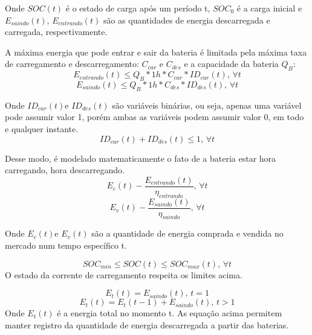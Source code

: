 Onde $SOC(t)$ é o estado de carga após um período t, $SOC_0$ é a carga inicial e  $E_{saindo}(t)$,  $E_{entrando}(t)$ são as quantidades de energia descarregada e carregada, respectivamente.

    A máxima energia que pode entrar e sair da bateria é limitada pela máxima taxa de carregamento e descarregamento: $C_{car}$ e $C_{des}$ e a capacidade da bateria $Q_B$:
\begin{equation}
    E_{entrando}(t) \leq Q_B*1h*C_{car}*ID_{car}(t),\,\forall t
\end{equation}
\begin{equation}
    E_{saindo}(t) \leq Q_B*1h*C_{des}*ID_{des}(t),\,\forall t
\end{equation}

Onde $ID_{car}(t)$e $ID_{des}(t)$ são variáveis binárias, ou seja, apenas uma variável pode assumir valor 1, porém ambas as variáveis podem assumir valor 0, em todo e qualquer instante.
\begin{equation}
    ID_{car}(t) +ID_{des}(t) \leq 1,\,\forall t 
\end{equation}

 Desse modo, é modelado matematicamente o fato de a bateria estar hora carregando, hora descarregando.
 \begin{equation}
     E_c(t) - \frac{E_{entrando}(t)}{\eta_{entrando}},\,\forall t 
 \end{equation}
\begin{equation}
    E_v(t) - \frac{E_{saindo}(t)}{\eta_{saindo}},\,\forall t
\end{equation}

Onde $E_c(t)$e $E_v(t)$ são a quantidade de energia comprada e vendida no mercado num tempo específico t.

\begin{equation}
    SOC_{min} \leq SOC(t) \leq SOC_{max}(t),\,\forall t   
\end{equation}
O estado da corrente de carregamento respeita os limites acima.

\begin{equation}
    E_t(t) = E_{saindo}(t),\, t = 1
\end{equation}
\begin{equation}
    \label{eq:constrain_last}
    E_t(t) = E_t(t-1) + E_{saindo}(t),\, t > 1 
\end{equation}
Onde $E_t(t)$ é a energia total no momento t. As equação acima permitem manter registro da quantidade de energia descarregada a partir das baterias.

